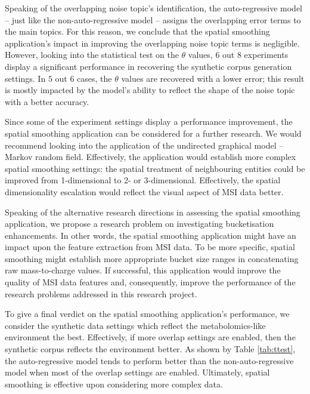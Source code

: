\documentclass{mpaper}
\begin{document}
\par Speaking of the overlapping noise topic's identification, the auto-regressive model -- just like the non-auto-regressive model -- assigns the overlapping error terms to the main topics. For this reason, we conclude that the spatial smoothing application's impact in improving the overlapping noise topic terms is negligible. However, looking into the statistical test on the $\theta$ values, $6$ out $8$ experiments display a significant performance in recovering the synthetic corpus generation settings. In $5$ out $6$ cases, the $\theta$ values are recovered with a lower error; this result is mostly impacted by the model's ability to reflect the shape of the noise topic with a better accuracy. 

\par Since some of the experiment settings display a performance improvement, the spatial smoothing application can be considered for a further research. We would recommend looking into the application of the undirected graphical model -- Markov random field. Effectively, the application would establish more complex spatial smoothing settings: the spatial treatment of neighbouring entities could be improved from 1-dimensional to 2- or 3-dimensional. Effectively, the spatial dimensionality escalation would reflect the visual aspect of MSI data better. 

\par Speaking of the alternative research directions in assessing the spatial smoothing application, we propose a research problem on investigating bucketisation enhancements. In other words, the spatial smoothing application might have an impact upon the feature extraction from MSI data. To be more specific, spatial smoothing might establish more appropriate bucket size ranges in concatenating raw mass-to-charge values. If successful, this application would improve the quality of MSI data features and, consequently, improve the performance of the research problems addressed in this research project. 

\par To give a final verdict on the spatial smoothing application's performance, we consider the synthetic data settings which reflect the metabolomics-like environment the best. Effectively, if more overlap settings are enabled, then the synthetic corpus reflects the environment better. As shown by Table \ref{tab:ttest}, the auto-regressive model tends to perform better than the non-auto-regressive model when most of the overlap settings are enabled. Ultimately, spatial smoothing is effective upon considering more complex data.



\end{document}
